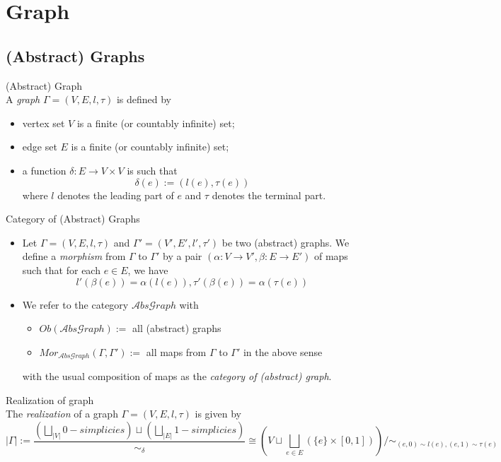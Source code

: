 \chapter{Graph}

\section{(Abstract) Graphs}

\begin{definition}{(Abstract) Graph}\\
A \textit{graph} $\Gamma = (V,E,l, \tau)$ is defined by
\begin{itemize}
    \item vertex set $V$ is a finite (or countably infinite) set;
    \item edge set $E$ is a finite (or countably infinite) set;
    \item a function $\delta : E \rightarrow V \times V$ is such that
    $$\delta (e) := (l(e), \tau (e))$$
    where $l$ denotes the leading part of $e$ and $\tau$ denotes the terminal part.
\end{itemize}
\end{definition}

\begin{definition}{Category of (Abstract) Graphs}\\
\begin{itemize}
    \item Let $\Gamma= (V,E,l, \tau)$ and $\Gamma'= (V',E',l',\tau')$ be two (abstract) graphs. We define a \textit{morphism} from $\Gamma$ to $\Gamma'$ by a pair $(\alpha: V \to V', \beta: E \to E')$ of maps such that for each $e \in E$, we have
    $$l' (\beta(e)) = \alpha(l(e)), \tau'(\beta(e)) =\alpha(\tau (e))$$
    \item We refer to the category $\mathcal{A}bs\mathcal{G}raph$ with
    \begin{itemize}
        \item $Ob(\mathcal{A}bs\mathcal{G}raph) :=$ all (abstract) graphs
        \item $Mor_{\mathcal{A}bs\mathcal{G}raph} (\Gamma,\Gamma') :=$ all maps from $\Gamma$ to $\Gamma'$ in the above sense
    \end{itemize}
    with the usual composition of maps as the \textit{category of (abstract) graph}.
\end{itemize}
\end{definition}


\begin{definition}{Realization of graph}\\
The \textit{realization} of a graph $\Gamma = (V,E,l, \tau)$ is given by
$$|\Gamma| := \frac{(\bigsqcup_{|V|} 0-simplicies) \sqcup (\bigsqcup_{|E|} 1-simplicies)}{\sim_\delta} \cong (V \sqcup \bigsqcup_{e \in E} (\{e\} \times [0,1]))/\sim_{(e,0) \sim l(e),(e,1) \sim \tau(e)}$$
\end{definition}

